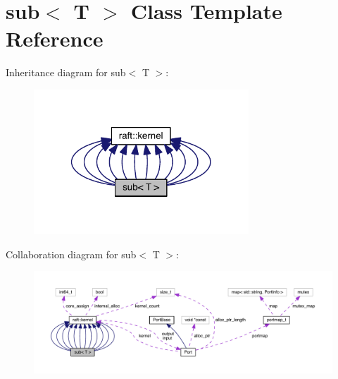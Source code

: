 \hypertarget{classsub}{}\section{sub$<$ T $>$ Class Template Reference}
\label{classsub}


Inheritance diagram for sub$<$ T $>$\+:
\nopagebreak
\begin{figure}[H]
\begin{center}
\leavevmode
\includegraphics[width=229pt]{classsub__inherit__graph}
\end{center}
\end{figure}


Collaboration diagram for sub$<$ T $>$\+:
\nopagebreak
\begin{figure}[H]
\begin{center}
\leavevmode
\includegraphics[width=350pt]{classsub__coll__graph}
\end{center}
\end{figure}
